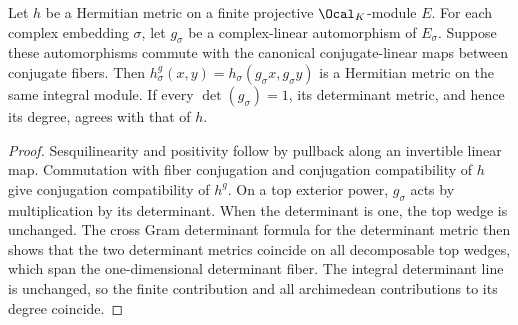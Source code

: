 \begin{lemma}
\label{lem:arithmetic-metric-variation}
\leanok
Let $h$ be a Hermitian metric on a finite projective $\Ocal_K$-module $E$.
For each complex embedding $\sigma$, let $g_\sigma$ be a complex-linear
automorphism of $E_\sigma$. Suppose these automorphisms commute with
the canonical conjugate-linear maps between conjugate fibers.
Then $h^g_\sigma(x,y)=h_\sigma(g_\sigma x,g_\sigma y)$ is a Hermitian
metric on the same integral module. If every $\det(g_\sigma)=1$,
its determinant metric, and hence its degree, agrees with that of $h$.
\end{lemma}
\begin{proof}
Sesquilinearity and positivity follow by pullback along an invertible
linear map. Commutation with fiber conjugation and conjugation
compatibility of $h$ give conjugation compatibility of $h^g$.
On a top exterior power, $g_\sigma$ acts by multiplication by its
determinant. When the determinant is one, the top wedge is unchanged.
The cross Gram determinant formula for the determinant metric then
shows that the two determinant metrics coincide on all decomposable
top wedges, which span the one-dimensional determinant fiber.
The integral determinant line is unchanged, so the finite contribution
and all archimedean contributions to its degree coincide.
\end{proof}

